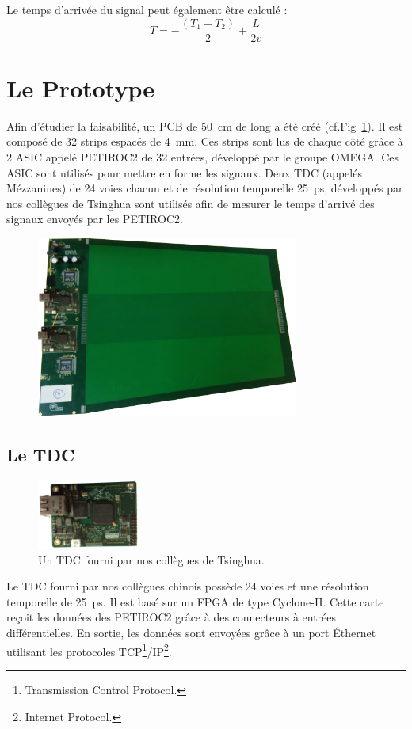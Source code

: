 Le temps d'arrivée du signal peut également être calculé :
\begin{equation}
\label{myformule}
T=-\frac{(T_1+T_2)}{2}+\frac{L}{2v}
\end{equation}

\section{Le Prototype}
Afin d'étudier la faisabilité, un PCB de \SI{50}{\centi\meter} de long a été créé (cf.Fig~\ref{PCB2}). Il est composé de \num{32} strips espacés de \SI{4}{\milli\meter}. Ces strips sont lus de chaque côté grâce à \num{2} ASIC appelé PETIROC2 \cite{Monzo:2017quz} de \num{32} entrées, développé par le groupe OMEGA. Ces ASIC sont utilisés pour mettre en forme les signaux. Deux TDC (appelés Mézzanines) de \num{24} voies chacun et de résolution temporelle \SI{25}{\pico\second}, développés par nos collègues de Tsinghua sont utilisés afin de mesurer le temps d'arrivé des signaux envoyés par les PETIROC2.

\begin{figure}[ht!]
	\centering
	\includegraphics[width=0.77\textwidth]{ELE/PCB2.png}
	\label{PCB2}
\end{figure}

\subsection{Le TDC}
\begin{figure}
	\vspace*{-1cm}
	\centering
	\includegraphics[width=0.30\textwidth]{ELE/TDC.png}
	\caption{Un TDC fourni par nos collègues de Tsinghua.}
	\label{tdc}
\end{figure}
Le TDC fourni par nos collègues chinois possède \num{24} voies et une résolution temporelle de \SI{25}{\pico\second}. Il est basé sur un FPGA de type Cyclone-II. Cette carte reçoit les données des PETIROC2 grâce à des connecteurs à entrées différentielles. En sortie, les données sont envoyées grâce à un port Éthernet utilisant les protocoles TCP\footnote{Transmission Control Protocol.}/IP\footnote{Internet Protocol.}.

